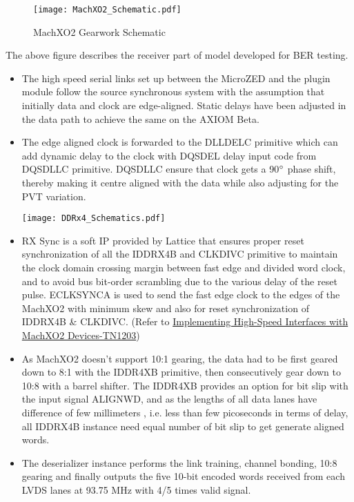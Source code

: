 \documentclass[11pt,oneside,fleqn]{book} %
\begin{document}
\begin{figure}[h!]
\centering\texttt{[image: MachXO2\_Schematic.pdf]}
\caption{MachXO2 Gearwork Schematic}
\end{figure}
The above figure describes the receiver part of model developed for BER testing.
\begin{itemize}
    \item The high speed serial links set up between the MicroZED and the plugin module follow the source synchronous system with the assumption that initially data and clock are edge-aligned. Static delays have been adjusted in the data path to achieve the same on the AXIOM Beta.
    \item The edge aligned clock is forwarded to the DLLDELC primitive which can add dynamic delay to the clock with DQSDEL delay input code from DQSDLLC primitive. DQSDLLC ensure that clock gets a 90$\degree$ phase shift, thereby making it centre aligned with the data while also adjusting for the PVT variation. \par
        \begin{minipage}{\linewidth}
        \centering\texttt{[image: DDRx4\_Schematics.pdf]}
        \center\caption{DDRx4 Gearing Schematic}
    \end{minipage}
    \item RX Sync is a soft IP provided by Lattice that ensures proper reset synchronization of all the IDDRX4B and CLKDIVC primitive to maintain the clock domain crossing margin between fast edge and divided word clock, and to avoid bus bit-order scrambling due to the various delay of the reset pulse. ECLKSYNCA is used to send the fast edge clock to the edges of the MachXO2 with minimum skew and also for reset synchronization of IDDRX4B \& CLKDIVC. (Refer to \textcolor{blue}{\href{https://www.latticesemi.com/view_document?document_id=39084}{ Implementing High-Speed Interfaces with MachXO2 Devices-TN1203}})
    \item As MachXO2 doesn't support 10:1 gearing, the data had to be first geared down to 8:1 with the IDDR4XB primitive, then consecutively gear down to 10:8  with a  barrel shifter.
    The IDDR4XB provides an option for bit slip with the input signal ALIGNWD, and as the lengths of all data lanes have difference of few millimeters , i.e. less than few picoseconds in terms of delay, all IDDRX4B instance need equal number of bit slip to get generate aligned words.
    \item The deserializer instance performs the link training, channel bonding, 10:8 gearing and finally outputs the five 10-bit encoded words received from each LVDS lanes at 93.75 MHz with 4/5 times valid signal.

\end{itemize}
\end{document}
